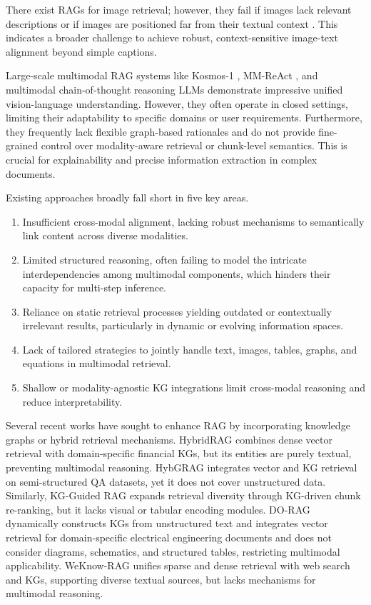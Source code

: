 \documentclass{svproc}
\begin{document}
There exist RAGs for image retrieval; however, they fail if images lack relevant descriptions or if images are positioned far from their textual context \cite{Beyond_Text}. This indicates a broader challenge to achieve robust, context-sensitive image-text alignment beyond simple captions.

Large-scale multimodal RAG systems like Kosmos-1 \cite{kosmos}, MM-ReAct \cite{mmreact}, and multimodal chain-of-thought reasoning LLMs \cite{MM-CoT} demonstrate impressive unified vision-language understanding. However, they often operate in closed settings, limiting their adaptability to specific domains or user requirements. Furthermore, they frequently lack flexible graph-based rationales and do not provide fine-grained control over modality-aware retrieval or chunk-level semantics. This is crucial for explainability and precise information extraction in complex documents.

Existing approaches broadly fall short in five key areas.
\begin{enumerate}
 \item Insufficient cross-modal alignment, lacking robust mechanisms to semantically link content across diverse modalities.
 \item Limited structured reasoning, often failing to model the intricate interdependencies among multimodal components, which hinders their capacity for multi-step inference.
 \item Reliance on static retrieval processes yielding outdated or contextually irrelevant results, particularly in dynamic or evolving information spaces.
 \item Lack of tailored strategies to jointly handle text, images, tables, graphs, and equations in multimodal retrieval.
 \item Shallow or modality-agnostic KG integrations limit cross-modal reasoning and reduce interpretability.
\end{enumerate}

Several recent works have sought to enhance RAG by incorporating knowledge graphs or hybrid retrieval mechanisms. HybridRAG \cite{HybridRAG} combines dense vector retrieval with domain-specific financial KGs, but its entities are purely textual, preventing multimodal reasoning. HybGRAG \cite{HybGRAG} integrates vector and KG retrieval on semi-structured QA datasets, yet it does not cover unstructured data. Similarly, KG-Guided \cite{KG-guided-RAG} RAG expands retrieval diversity through KG-driven chunk re-ranking, but it lacks visual or tabular encoding modules. DO-RAG \cite{DO-RAG} dynamically constructs KGs from unstructured text and integrates vector retrieval for domain-specific electrical engineering documents and does not consider diagrams, schematics, and structured tables, restricting multimodal applicability. WeKnow-RAG \cite{xie2024weknowragadaptiveapproachretrievalaugmented} unifies sparse and dense retrieval with web search and KGs, supporting diverse textual sources, but lacks mechanisms for multimodal reasoning.
\end{document}
